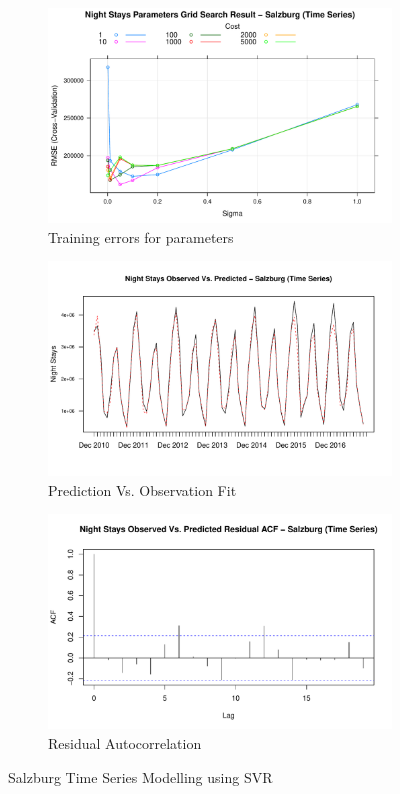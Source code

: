 \documentclass[a4paper,reqno,]{article}
\begin{document}
\begin{figure}[h!]
  \centering
  \begin{subfigure}[b]{0.32\linewidth}
    \includegraphics[width=\linewidth]{images/SVR/SalzburgGrid.pdf}
    \caption{Training errors for parameters}
  \end{subfigure}
  \begin{subfigure}[b]{0.32\linewidth}
    \includegraphics[width=\linewidth]{images/SVR/SalzburgTimeSeries.pdf}
    \caption{Prediction Vs. Observation Fit}
  \end{subfigure}
  \begin{subfigure}[b]{0.32\linewidth}
    \includegraphics[width=\linewidth]{images/SVR/SalzburgACF.pdf}
    \caption{Residual Autocorrelation}
  \end{subfigure}
  \caption{Salzburg Time Series Modelling using SVR}
  \label{fig:Time Series}
\end{figure}
\end{document}
